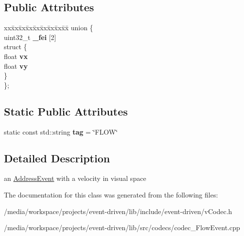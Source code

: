 \subsection*{Public Attributes}
\begin{DoxyCompactItemize}
\item 
\mbox{\label{classev_1_1FlowEvent_a6f7cdf3ec22ead9e2faaebd4a213279f}} 
\begin{tabbing}
xx\=xx\=xx\=xx\=xx\=xx\=xx\=xx\=xx\=\kill
union \{\\
\>uint32\_t {\bfseries \_fei} \mbox{[}2\mbox{]}\\
\mbox{\label{unionev_1_1FlowEvent_1_1_0D9_a174994f064562221bd6c96077d16eeb9}} 
\>struct \{\\
\>\>float {\bfseries vx}\\
\>\>float {\bfseries vy}\\
\>\} \\
\}; \\

\end{tabbing}\end{DoxyCompactItemize}
\subsection*{Static Public Attributes}
\begin{DoxyCompactItemize}
\item 
\mbox{\label{classev_1_1FlowEvent_a583ae9aaa6cbcbe1779eab526b5df1de}} 
static const std\+::string {\bfseries tag} = \char`\"{}F\+L\+OW\char`\"{}
\end{DoxyCompactItemize}


\subsection{Detailed Description}
an \hyperlink{classev_1_1AddressEvent}{Address\+Event} with a velocity in visual space 

The documentation for this class was generated from the following files\+:\begin{DoxyCompactItemize}
\item 
/media/workspace/projects/event-\/driven/lib/include/event-\/driven/v\+Codec.\+h\item 
/media/workspace/projects/event-\/driven/lib/src/codecs/codec\+\_\+\+Flow\+Event.\+cpp\end{DoxyCompactItemize}
